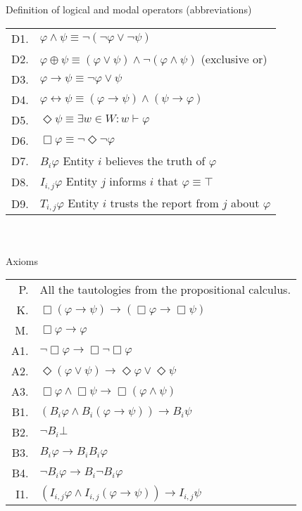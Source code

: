 \documentclass[12pt,oneside]{article}
\begin{document}
\begin{table*}[!t]
\centering
Definition of logical and modal operators (abbreviations) \\
\begin{tabular}{r l}
D1. & $\varphi \wedge \psi \equiv \neg ( \neg \varphi \vee \neg \psi)$\\
D2. & $\varphi \oplus \psi \equiv (\varphi \vee \psi) \wedge \neg(\varphi \wedge \psi)$ (exclusive or)\\
D3. & $\varphi \rightarrow \psi \equiv \neg \varphi \vee \psi $\\
D4. & $\varphi \leftrightarrow \psi \equiv (\varphi \rightarrow \psi) \wedge (\psi \rightarrow \varphi)$\\
D5. & $\Diamond \psi \equiv \exists w \in W : w \vdash \varphi $\\
D6. & $\Box \varphi \equiv \neg \Diamond \neg \varphi $\\
D7. & $B_i \varphi$ Entity $i$ believes the truth of $\varphi$\\
D8. & $I_{i,j} \varphi$ Entity $j$ informs $i$ that $\varphi \equiv \top$\\
D9. & $T_{i,j} \varphi$ Entity $i$ trusts the report from $j$ about $\varphi$ \\
\end{tabular} \\~\\
Axioms \\
\begin{tabular}{r l}
P. & All the tautologies from the propositional calculus.\\
K. & $\Box (\varphi \rightarrow \psi) \rightarrow (\Box \varphi \rightarrow \Box \psi)$\\
M. & $\Box \varphi \rightarrow \varphi$\\
A1. & $\neg \Box \varphi \rightarrow \Box \neg \Box \varphi $\\
A2. & $\Diamond (\varphi \vee \psi) \rightarrow \Diamond \varphi \vee \Diamond \psi $\\
A3. & $\Box \varphi \wedge \Box \psi \rightarrow \Box (\varphi \wedge \psi)$ \\
B1. & $(B_i \varphi \wedge B_i (\varphi \rightarrow \psi )) \rightarrow B_i \psi$ \\
B2. & $\neg B_i \bot$\\
B3. & $B_i \varphi \rightarrow B_i B_i \varphi$ \\
B4. & $\neg B_i \varphi \rightarrow B_i \neg B_i \varphi$\\
I1. & $(I_{i,j} \varphi \wedge I_{i,j} (\varphi \rightarrow \psi )) \rightarrow I_{i,j} \psi$\\

\end{tabular}
\end{table*}
\end{document}
